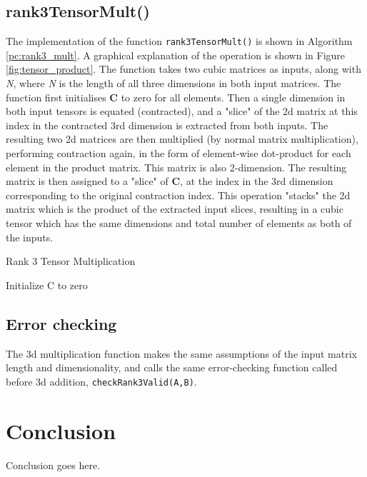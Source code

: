 \documentclass[10 pt, conference]{cssconf}
\begin{document}
\subsection{rank3TensorMult()}
The implementation of the function \verb|rank3TensorMult()| is shown in Algorithm \ref{pc:rank3_mult}. A graphical explanation of the operation is shown in Figure \ref{fig:tensor_product}. The function takes two cubic matrices as inputs, along with \textit{N}, where \textit{N} is the length of all three dimensions in both input matrices. The function first initialises $\mathbf{C}$ to zero for all elements. Then a single dimension in both input tensors is equated (contracted), and a "slice" of the 2d matrix at this index in the contracted 3rd dimension is extracted from both inputs. The resulting two 2d matrices are then multiplied (by normal matrix multiplication), performing contraction again, in the form of element-wise dot-product for each element in the product matrix. This matrix is also 2-dimension. The resulting matrix is then assigned to a "slice" of $\mathbf{C}$, at the index in the 3rd dimension corresponding to the original contraction index. This operation "stacks" the 2d matrix which is the product of the extracted input slices, resulting in a cubic tensor which has the same dimensions and total number of elements as both of the inputs.

\begin{algorithm}[ht]
\caption{Rank 3 Tensor Multiplication}\label{pc:rank3_mult}
    	 \SetAlgoLined
	Initialize C to zero\;
\end{algorithm}

\subsection{Error checking}
The 3d multiplication function makes the same assumptions of the input matrix length and dimensionality, and calls the same error-checking function called before 3d addition, \verb|checkRank3Valid(A,B)|.
\addtolength{\textheight}{-11.0cm} 
\section{Conclusion}
Conclusion goes here.

\clearpage
\newpage
\onecolumn

{}


\end{document}
